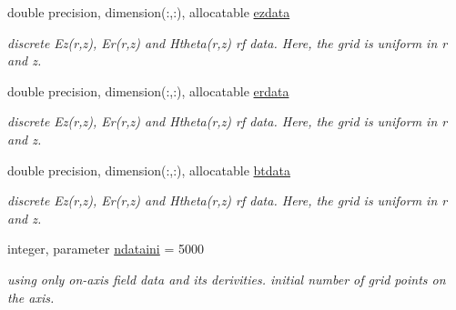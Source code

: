 \textbf{ }\par
\begin{DoxyCompactItemize}
\item 
double precision, dimension(\+:,\+:), allocatable \mbox{\hyperlink{namespacedataclass_a2f3f7950dbca31f394856d31781256f3}{ezdata}}
\begin{DoxyCompactList}\small\item\em discrete Ez(r,z), Er(r,z) and Htheta(r,z) rf data. Here, the grid is uniform in r and z. \end{DoxyCompactList}\item 
double precision, dimension(\+:,\+:), allocatable \mbox{\hyperlink{namespacedataclass_a4f3abc6db52a89363b184d4bec9ebff8}{erdata}}
\begin{DoxyCompactList}\small\item\em discrete Ez(r,z), Er(r,z) and Htheta(r,z) rf data. Here, the grid is uniform in r and z. \end{DoxyCompactList}\item 
double precision, dimension(\+:,\+:), allocatable \mbox{\hyperlink{namespacedataclass_a09d27eeab42c3e3369268d8ce133a2c0}{btdata}}
\begin{DoxyCompactList}\small\item\em discrete Ez(r,z), Er(r,z) and Htheta(r,z) rf data. Here, the grid is uniform in r and z. \end{DoxyCompactList}\end{DoxyCompactItemize}

\textbf{ }\par
\begin{DoxyCompactItemize}
\item 
integer, parameter \mbox{\hyperlink{namespacedataclass_a2578bbe9c4dc0892ee08a8619cd7e978}{ndataini}} = 5000
\begin{DoxyCompactList}\small\item\em using only on-\/axis field data and its derivities. initial number of grid points on the axis. \end{DoxyCompactList}\end{DoxyCompactItemize}

